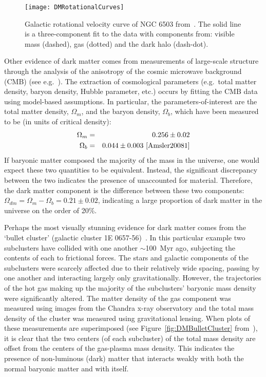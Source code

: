 		\begin{figure}
			\centering
			\texttt{[image: DMRotationalCurves]}
			\caption[Galactic rotational velocity curve of NGC 6503.]{Galactic rotational velocity curve of NGC 6503
			from~\cite{Begeman:1991iy}.  The solid line is a three-component fit to the data with components from:
			visible mass (dashed), gas (dotted) and the dark halo (dash-dot).  }
			\label{fig:DMRotCurve}
		\end{figure}
	Other evidence of dark matter comes from measurements of large-scale structure through the analysis of the anisotropy of the cosmic microwave background (CMB) (see e.g.~\cite{Amsler20081}).  The extraction of cosmological parameters (e.g.~total matter density, baryon density, Hubble parameter, etc.) occurs by fitting the CMB data using model-based assumptions.  In particular, the parameters-of-interest are the total matter density, $\Omega_{m}$, and the baryon density, $\Omega_{b}$, which have been measured to be (in units of critical density):
		\begin{eqnarray*}
			\Omega_{m} & = & 0.256 \pm 0.02 \\
			\Omega_{b} & = & 0.044 \pm 0.003~\cite{Amsler20081}
		\end{eqnarray*}
If baryonic matter composed the majority of the mass in the universe, one would expect these two quantities to be equivalent.  Instead, the significant discrepancy between the two indicates the presence of unaccounted for material.  Therefore, the dark matter component is the difference between these two components: $\Omega_{dm} = \Omega_{m} - \Omega_{b} = 0.21 \pm 0.02$, indicating a large proportion of dark matter in the universe on the order of 20\%.

	
	Perhaps the most visually stunning evidence for dark matter comes from the
`bullet cluster' (galactic cluster 1E 0657-56)~\cite{Clowe06}.  In this
particular example two subclusters have collided with one another $\sim$100~Myr
ago, subjecting the contents of each to frictional forces.  The stars and
galactic components of the subclusters were scarcely affected due to their relatively wide spacing, passing by
one another and interacting largely only gravitationally. However, the trajectories
of the hot gas making up the majority of the subclusters' baryonic mass density
were significantly altered.  The matter density of the gas component was
measured using images from the Chandra x-ray observatory and the total mass
density of the cluster was measured using gravitational lensing.  When plots of
these measurements are superimposed (see Figure~\ref{fig:DMBulletCluster}
from~\cite{Clowe06}), it is clear that the two centers (of each subcluster) of
the total mass density are offset from the centers of the gas-plasma mass
density.  This indicates the presence of non-luminous (dark) matter that 
interacts weakly with both the normal baryonic matter and with itself.  
	
